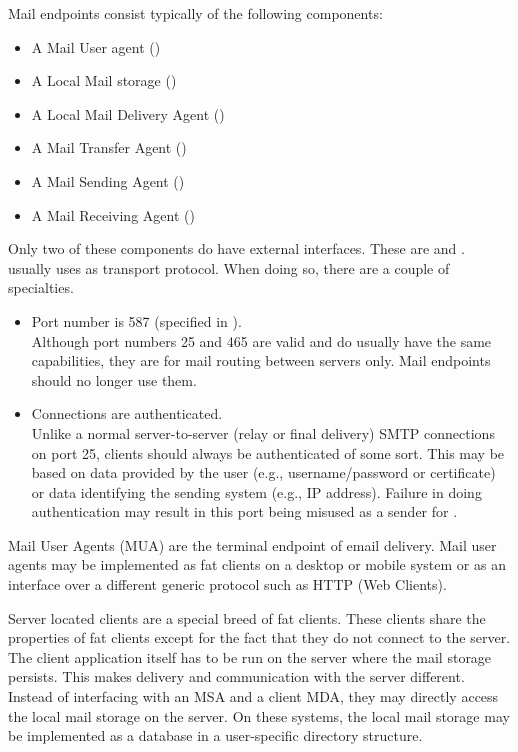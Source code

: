 Mail endpoints consist typically of the following components:
\begin{itemize}
	\item A Mail User agent ()
	\item A Local Mail storage ()
	\item A Local Mail Delivery Agent ()
	\item A Mail Transfer Agent ()
	\item A Mail Sending Agent ()
	\item A Mail Receiving Agent ()
\end{itemize}

Only two of these components do have external interfaces. These are  and .  usually uses  as transport protocol. When doing so, there are a couple of specialties. 
\begin{itemize}
	\item Port number is 587 (specified in \cite{RFC4409}).\\
	Although port numbers 25 and 465 are valid and do usually have the same capabilities, they are for mail routing between servers only. Mail endpoints should no longer use them.
	\item Connections are authenticated.\\
	Unlike a normal server-to-server (relay or final delivery) SMTP connections on port 25, clients should always be authenticated of some sort. This may be based on data provided by the user (e.g., username/password or certificate) or data identifying the sending system (e.g., IP address)\cite{RFC4409}. Failure in doing authentication may result in this port being misused as a sender for .
\end{itemize}

Mail User Agents (MUA) are the terminal endpoint of email delivery. Mail user agents may be implemented as fat clients on a desktop or mobile system or as an interface over a different generic protocol such as HTTP (Web Clients). 

Server located clients are a special breed of fat clients. These clients share the properties of fat clients except for the fact that they do not connect to the server. The client application itself has to be run on the server where the mail storage persists. This makes delivery and communication with the server different. Instead of interfacing with an MSA and a client MDA, they may directly access the local mail storage on the server. On these systems, the local mail storage may be implemented as a database in a user-specific directory structure.

